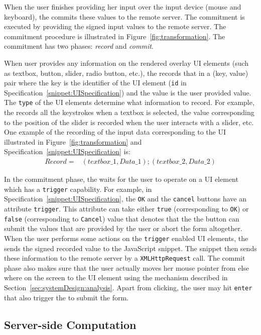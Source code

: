 When the user finishes providing her input over the input device (mouse and keyboard), the \device commits these values to the remote server. The commitment is executed by providing the signed input values to the remote server. The commitment procedure is illustrated in Figure~\ref{fig:transformation}. The commitment has two phases: \emph{record} and \emph{commit}.

 When user provides any information on the rendered overlay UI elements (such as textbox, button, slider, radio button, etc.), the \device records that in a (key, value) pair where the key is the identifier of the UI element (\texttt{id} in Specification~\ref{snippet:UISpecification}) and the value is the user provided value. The \texttt{type} of the UI elements determine what information to record. For example, the \device records all the keystrokes when a textbox is selected, the value corresponding to the position of the slider is recorded when the user interacts with a slider, etc. One example of the recording of the input data corresponding to the UI illustrated in Figure~\ref{fig:transformation} and Specification~\ref{snippet:UISpecification} is: 
\begin{align*}
Record = & (textbox\_1, Data\_1);(textbox\_2,Data\_2)
\end{align*}

 In the commitment phase, the \device waits for the user to operate on a UI element which has a \texttt{trigger} capability. For example, in Specification~\ref{snippet:UISpecification}, the \texttt{OK} and the \texttt{cancel} buttons have an attribute \texttt{trigger}. This attribute can take either \texttt{true} (corresponding to \texttt{OK}) or \texttt{false} (corresponding to \texttt{Cancel}) value that denotes that the the button can submit the values that are provided by the user or abort the form altogether. When the user performs some actions on the \texttt{trigger} enabled UI elements, the \device sends the signed recorded value to the \name JavaScript snippet. The \name \js snippet then sends these information to the remote server by a \texttt{XMLHttpRequest} call. The commit phase also makes sure that the user actually moves her mouse pointer from else where on the screen to the UI element using the \pop mechanism described in Section~\ref{sec:systemDesign:analysis}. Apart from clicking, the user may hit \texttt{enter} that also trigger the \device to submit the form. 


\subsection{Server-side Computation}
\label{sec:systemDesign:serverSide}

